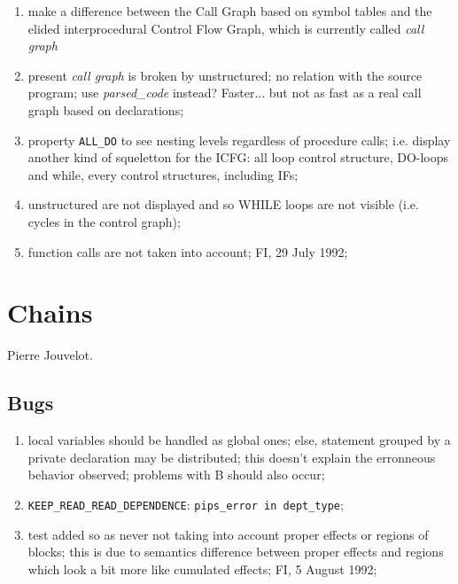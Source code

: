 \begin{enumerate}

  \item make a difference between the Call Graph based on symbol tables
        and the elided interprocedural Control Flow Graph, which is
        currently called {\em call graph}

  \item present {\em call graph} is broken by
        unstructured; no relation with the source program; use {\em
        parsed\_code} instead? Faster... but not as fast as a real call
        graph based on declarations; 

  \item property \verb+ALL_DO+ to see nesting levels regardless of procedure
        calls; i.e. display another kind of squeletton for the ICFG:
        all loop control structure, DO-loops and while, every control
        structures, including IFs;

  \item unstructured are not displayed and so WHILE loops are not
        visible (i.e. cycles in the control graph);

  \item function calls are not taken into account; FI, 29 July 1992;

\end{enumerate}

\section{Chains}

Pierre Jouvelot.

\subsection{Bugs}

\begin{enumerate}

  \item local variables should be handled as global ones; else,
        statement grouped by a private declaration may be distributed;
        this doesn't explain the erronneous behavior observed; problems with
        B should also occur;

  \item \verb+KEEP_READ_READ_DEPENDENCE+: \verb+pips_error in dept_type+;

  \item test added so as never not taking into account proper effects or
        regions of blocks; this is due to semantics difference between
        proper effects and regions which look a bit more like cumulated
        effects; FI, 5 August 1992;

\end{enumerate}

